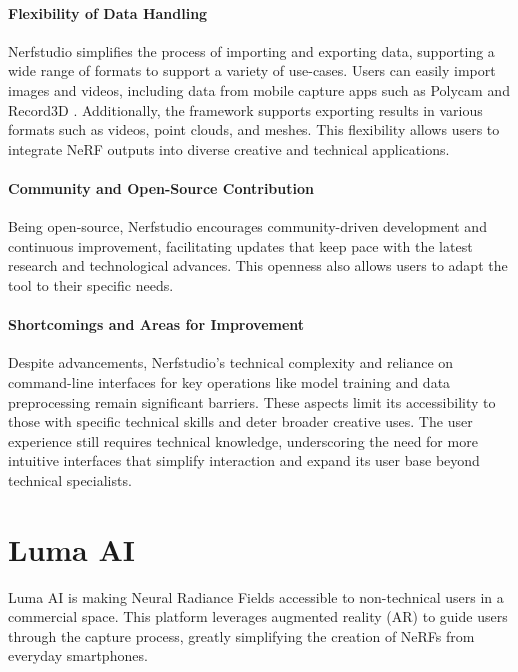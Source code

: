 \paragraph{Flexibility of Data Handling}
Nerfstudio simplifies the process of importing and exporting data, supporting a wide range of formats to support a variety of use-cases.
Users can easily import images and videos, including data from mobile capture apps such as Polycam \cite{noauthor_polycam_nodate} and Record3D \cite{noauthor_record3d_nodate}.
Additionally, the framework supports exporting results in various formats such as videos, point clouds, and meshes.
This flexibility allows users to integrate NeRF outputs into diverse creative and technical applications.

\paragraph{Community and Open-Source Contribution}
Being open-source, Nerfstudio encourages community-driven development and continuous improvement, facilitating updates that keep pace with the latest research and technological advances.
This openness also allows users to adapt the tool to their specific needs.

\paragraph{Shortcomings and Areas for Improvement}

Despite advancements, Nerfstudio's technical complexity and reliance on command-line interfaces for key operations like model training and data preprocessing remain significant barriers.
These aspects limit its accessibility to those with specific technical skills and deter broader creative uses.
The user experience still requires technical knowledge, underscoring the need for more intuitive interfaces that simplify interaction and expand its user base beyond technical specialists.

\section{Luma AI}
\label{sec:related:lmua}

Luma AI \cite{ai_luma_nodate} is making Neural Radiance Fields accessible to non-technical users in a commercial space.
This platform leverages augmented reality (AR) to guide users through the capture process, greatly simplifying the creation of NeRFs from everyday smartphones.

